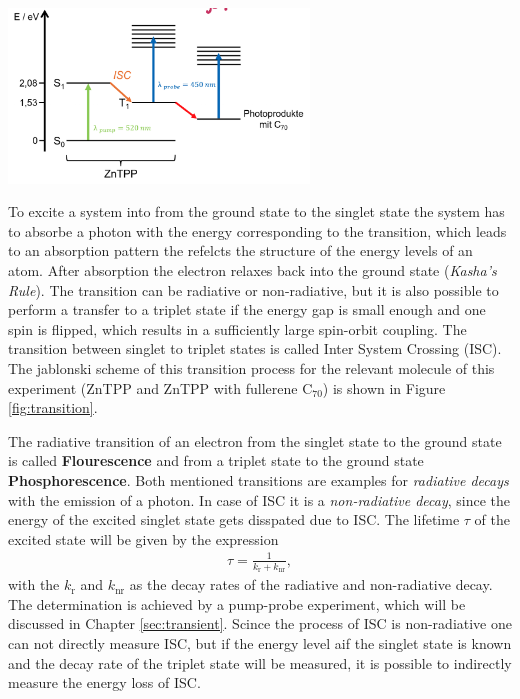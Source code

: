\begin{center}
    \captionsetup{type = figure}
    \includegraphics[width = 0.6\textwidth]{Pictures/Transition.png}
    \label{fig:transition}
\end{center}
To excite a system into from the ground state to the singlet state the system has to absorbe a photon with the energy corresponding to the transition, which leads to an absorption pattern the refelcts the structure of the energy levels of an atom. After absorption the electron relaxes back into the ground state (\textit{Kasha's Rule}). The transition can be radiative or non-radiative, but it is also possible to perform a transfer to a triplet state if the energy gap is small enough and one spin is flipped, which results in a sufficiently large spin-orbit coupling. The transition between singlet to triplet states is called Inter System Crossing (ISC). The jablonski scheme of this transition process for the relevant molecule of this experiment (ZnTPP and ZnTPP with fullerene $\mathrm{C}_{70}$) is shown in Figure \ref{fig:transition}. 
\bigskip

The radiative transition of an electron from the singlet state to the ground state is called \textbf{Flourescence} and from a triplet state to the ground state \textbf{Phosphorescence}. Both mentioned transitions are examples for \textit{radiative decays} with the emission of a photon. In case of ISC it is a \textit{non-radiative decay}, since the energy of the excited singlet state gets disspated due to ISC. The lifetime $\tau$ of the excited state will be given by the expression
\begin{gather}
    \tau = \frac{1}{k_\mathrm{r} + k_\mathrm{nr}},
\end{gather}
with the $k_\mathrm{r}$ and $k_\mathrm{nr}$ as the decay rates of the radiative and non-radiative decay. The determination is achieved by a pump-probe experiment, which will be discussed in Chapter \ref{sec:transient}. \cite{Kilchert.04.2023}
Scince the process of ISC is non-radiative one can not directly measure ISC, but if the energy level aif the singlet state is known and the decay rate of the triplet state will be measured, it is possible to indirectly measure the energy loss of ISC.